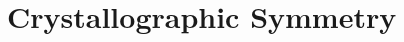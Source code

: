 %




\renewcommand{\chaptergraphicspath}{src/Symmetry/eps/}

\chapterimage{\noheaderimage}

\chapter{Crystallographic Symmetry\label{chap:Symmetry}}


\newcommand{\mbmi}[1]{$\mathbf{\mathit{#1}}$}

